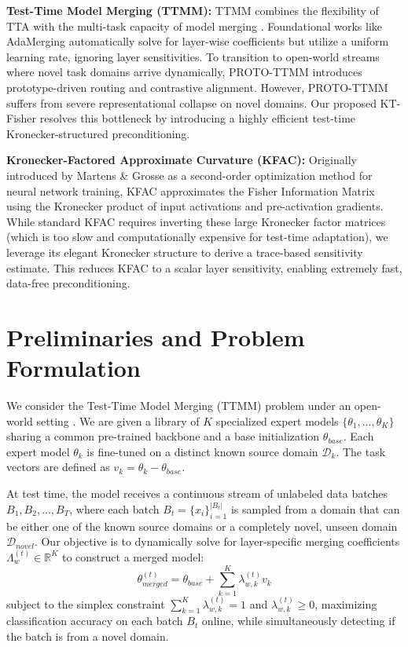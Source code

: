 \documentclass{article}
\theoremstyle{plain}
\theoremstyle{definition}
\theoremstyle{remark}
\begin{document}
\textbf{Test-Time Model Merging (TTMM):} TTMM combines the flexibility of TTA with the multi-task capacity of model merging \cite{yang2024adamerging}. Foundational works like AdaMerging \cite{yang2024adamerging} automatically solve for layer-wise coefficients but utilize a uniform learning rate, ignoring layer sensitivities. To transition to open-world streams where novel task domains arrive dynamically, PROTO-TTMM \cite{zhao2024dynamic} introduces prototype-driven routing and contrastive alignment. However, PROTO-TTMM suffers from severe representational collapse on novel domains. Our proposed KT-Fisher resolves this bottleneck by introducing a highly efficient test-time Kronecker-structured preconditioning.

\textbf{Kronecker-Factored Approximate Curvature (KFAC):} Originally introduced by Martens \& Grosse \cite{martens2015optimizing} as a second-order optimization method for neural network training, KFAC approximates the Fisher Information Matrix using the Kronecker product of input activations and pre-activation gradients. While standard KFAC requires inverting these large Kronecker factor matrices (which is too slow and computationally expensive for test-time adaptation), we leverage its elegant Kronecker structure to derive a trace-based sensitivity estimate. This reduces KFAC to a scalar layer sensitivity, enabling extremely fast, data-free preconditioning.

\section{Preliminaries and Problem Formulation}
\label{prelims}
We consider the Test-Time Model Merging (TTMM) problem under an open-world setting \cite{zhao2024dynamic}. We are given a library of $K$ specialized expert models $\{\theta_1, \dots, \theta_K\}$ sharing a common pre-trained backbone and a base initialization $\theta_{base}$. Each expert model $\theta_k$ is fine-tuned on a distinct known source domain $\mathcal{D}_k$. The task vectors are defined as $v_k = \theta_k - \theta_{base}$.

At test time, the model receives a continuous stream of unlabeled data batches $B_1, B_2, \dots, B_T$, where each batch $B_t = \{x_i\}_{i=1}^{|B_t|}$ is sampled from a domain that can be either one of the known source domains or a completely novel, unseen domain $\mathcal{D}_{novel}$. Our objective is to dynamically solve for layer-specific merging coefficients $\Lambda_w^{(t)} \in \mathbb{R}^K$ to construct a merged model:
\begin{equation}
    \theta_{merged}^{(t)} = \theta_{base} + \sum_{k=1}^K \lambda_{w,k}^{(t)} v_k
\end{equation}
subject to the simplex constraint $\sum_{k=1}^K \lambda_{w,k}^{(t)} = 1$ and $\lambda_{w,k}^{(t)} \geq 0$, maximizing classification accuracy on each batch $B_t$ online, while simultaneously detecting if the batch is from a novel domain.
\end{document}
